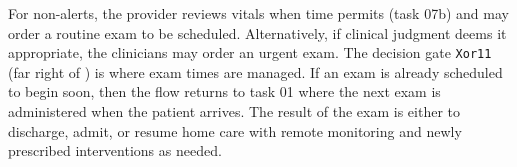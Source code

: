 For non-alerts, the provider reviews vitals when time permits (task 07b) and may order a routine exam to be scheduled. Alternatively, if clinical judgment deems it appropriate, the clinicians may order an urgent exam. The decision gate \texttt{Xor11} (far right of ) is where exam times are managed. If an exam is already scheduled to begin soon, then the flow returns to task 01 where the next exam is administered when the patient arrives. The result of the exam is either to discharge, admit, or resume home care with remote monitoring and newly prescribed interventions as needed.

\begin{comment}

It is not possible to manually reason about the correctness of the workflow models in taking actions on risk awareness given the concurrency in the workflow and the several asynchronous interactions with the risk awareness both to update the risk and make decisions on the risk. The adaptation of model checking to formally reason about the correctness of the system in an automated way is an important and novel contribution to verifying the functionality of joint human-computer teams. 

  The rest of this paper describes the verification of the workflow against the CWP as a verification requirement. The verification is accomplished with the SPIN model checker. 

The CWP in \figref{fig:cwp} is translated into equivalent Linear Temporal Logic (LTL), and the workflow in \figref{fig:bpmn} is translated into its equivalent Promela model, where Promela is the input language for SPIN. The SPIN model checker then verifies that the workflow in its current form does indeed implement the CWP.
\end{comment}